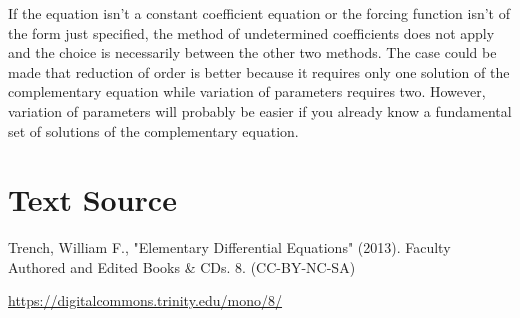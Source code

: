 \documentclass{ximera}
\begin{document}
If the equation isn't  a constant coefficient equation or the forcing
function isn't  of the form just specified,  the method of
undetermined coefficients does not apply and the choice is necessarily
between the other two methods. The case could be made that reduction
of order is better because it requires only one solution of the
complementary equation while variation of parameters requires two.
However, variation of parameters will probably be easier if you
already know a fundamental set of solutions of the complementary
equation.
 
 
 
\section*{Text Source}
Trench, William F., "Elementary Differential Equations" (2013). Faculty Authored and Edited Books \& CDs. 8. (CC-BY-NC-SA)
 
\href{https://digitalcommons.trinity.edu/mono/8/}{https://digitalcommons.trinity.edu/mono/8/}
 
\end{document}
